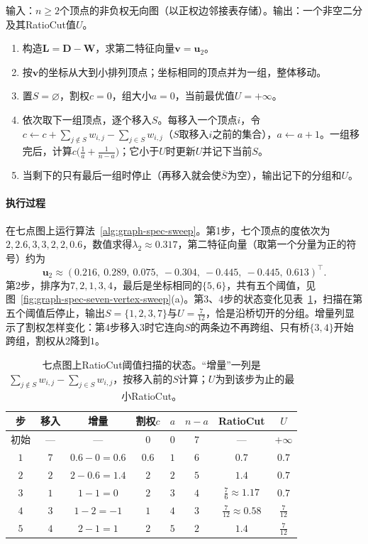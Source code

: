 \begin{algorithm}
\label{alg:graph-spec-sweep}
输入：$n\geq2$个顶点的非负权无向图（以正权边邻接表存储）。输出：一个非空二分及其RatioCut值$U$。
\begin{enumerate}
 \item 构造$\bm L=\bm D-\bm W$，求第二特征向量$\bm v=\bm u_2$。
 \item 按$\bm v$的坐标从大到小排列顶点；坐标相同的顶点并为一组，整体移动。
 \item 置$S=\varnothing$，割权$c=0$，组大小$a=0$，当前最优值$U=+\infty$。
 \item 依次取下一组顶点，逐个移入$S$。每移入一个顶点$i$，令$c\gets c+\sum_{j\notin S}w_{i,j}-\sum_{j\in S}w_{i,j}$（$S$取移入$i$之前的集合），$a\gets a+1$。一组移完后，计算$c\bigl(\tfrac1a+\tfrac1{n-a}\bigr)$；它小于$U$时更新$U$并记下当前$S$。
 \item 当剩下的只有最后一组时停止（再移入就会使$\bar S$为空），输出记下的分组和$U$。
\end{enumerate}
\end{algorithm}

\paragraph{执行过程}
在七点图上运行算法~\ref{alg:graph-spec-sweep}。第1步，七个顶点的度依次为$2,2.6,3,3,2,2,0.6$，数值求得$\lambda_2\approx0.317$，第二特征向量（取第一个分量为正的符号）约为
\[
 \bm u_2\approx(0.216,\ 0.289,\ 0.075,\ -0.304,\ -0.445,\ -0.445,\ 0.613)^{\top}.
\]
第2步，排序为$7,2,1,3,4$，最后是坐标相同的$\{5,6\}$，共有五个阈值，见图~\ref{fig:graph-spec-seven-vertex-sweep}(a)。第3、4步的状态变化见表~\ref{tab:graph-spec-ratio-cut-sweep}，扫描在第五个阈值后停止，输出$S=\{1,2,3,7\}$与$U=\tfrac7{12}$，恰是沿桥切开的分组。增量列显示了割权怎样变化：第$4$步移入$3$时它连向$S$的两条边不再跨组、只有桥$\{3,4\}$开始跨组，割权从$2$降到$1$。

\begin{table}[!htb]
  \centering
  \caption{七点图上RatioCut阈值扫描的状态。“增量”一列是$\sum_{j\notin S}w_{i,j}-\sum_{j\in S}w_{i,j}$，按移入前的$S$计算；$U$为到该步为止的最小RatioCut。}
  \label{tab:graph-spec-ratio-cut-sweep}
  \small
  \begin{tabular}{@{}cccccccc@{}}
    \toprule
    步 & 移入 & 增量 & 割权$c$ & $a$ & $n-a$ & RatioCut & $U$ \\
    \midrule
    初始 & — & — & $0$ & $0$ & $7$ & — & $+\infty$ \\
    $1$ & $7$ & $0.6-0=0.6$ & $0.6$ & $1$ & $6$ & $0.7$ & $0.7$ \\
    $2$ & $2$ & $2-0.6=1.4$ & $2$ & $2$ & $5$ & $1.4$ & $0.7$ \\
    $3$ & $1$ & $1-1=0$ & $2$ & $3$ & $4$ & $\tfrac76\approx1.17$ & $0.7$ \\
    $4$ & $3$ & $1-2=-1$ & $1$ & $4$ & $3$ & $\tfrac7{12}\approx0.58$ & $\tfrac7{12}$ \\
    $5$ & $4$ & $2-1=1$ & $2$ & $5$ & $2$ & $1.4$ & $\tfrac7{12}$ \\
    \bottomrule
  \end{tabular}
\end{table}

